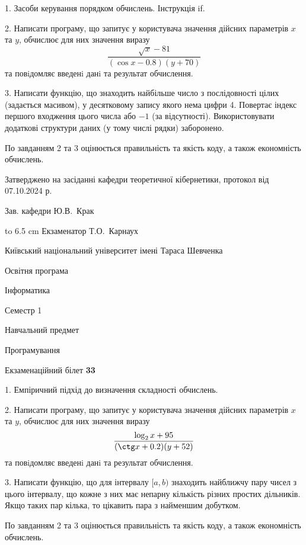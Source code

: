 \documentclass[12pt, ukrainian]{article}
\begin{document}
{%
1. Засоби керування порядком обчислень. Інструкція if.%
\par
2. Написати програму, що запитує у користувача значення дійсних параметрів $x$ та $y$, обчислює для них значення виразу 
$$\frac{\sqrt x - 81}{(\cos x - 0.8) (y + 70)}$$ 
та повiдомляє введенi данi та результат обчислення.

\par
3. Написати функцію, що знаходить найбільше число з послідовності цілих (задається масивом), у десятковому запису якого нема цифри 4. Повертає індекс першого входження цього числа або $-1$ (за відсутності). Використовувати додаткові структури даних (у тому числі рядки) заборонено.

По завданням 2 та 3 оцінюється правильність та якість коду, а також економність обчислень.

}
{\smallskip\smallskip \begin {scriptsize} Затверджено на засіданні кафедри теоретичної кібернетики, протокол   від   07.10.2024 р.\par\smallskip\smallskip\smallskip\smallskip
{\parbox {6.5 cm} {Зав. кафедри \dotfill Ю.В.~Крак}}\hspace {0.7cm} {\hbox to 6.5 cm { Екзаменатор \dotfill Т.О.~Карнаух}} \end{scriptsize}}
\vspace{0.9cm}
{{\begin {scriptsize}\par
{ \center  Київський національний університет імені Тараса Шевченка \par}
{\parbox {5 cm}{Освітня програма \hfill}{\parbox {7 cm}{Інформатика\hfill}}\parbox {6 cm}{\hfill Семестр 1}}\par
{\parbox {5 cm} {Навчальний предмет \hfill}\parbox {7 cm}{Програмування \hfill}\parbox {6cm}{\hfill}\par}\vspace{-15pt} \end{scriptsize}}{\center Екзаменаційний білет \No \textbf { 33 }\par}}
{%
1. Емпіричний підхід до визначення складності обчислень.%
\par
2. Написати програму, що запитує у користувача значення дійсних параметрів $x$ та $y$, обчислює для них значення виразу 
$$\frac{\log_{2} x + 95}{(\ctg x + 0.2) (y + 52)}$$ 
та повiдомляє введенi данi та результат обчислення.

\par
3. Написати функцію, що для інтервалу $[a, b)$ знаходить найближчу пару чисел з цього інтервалу, що кожне з них має непарну кількість різних простих дільників. Якщо таких пар кілька, то цікавить пара з найменшим добутком.

По завданням 2 та 3 оцінюється правильність та якість коду, а також економність обчислень.

}
\end{document}
